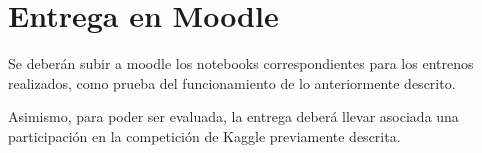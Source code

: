 \documentclass[a4paper]{article}
\begin{document}
\section{Entrega en Moodle}
Se deberán subir a moodle los notebooks correspondientes para los entrenos realizados, como prueba del funcionamiento de lo anteriormente descrito.

Asimismo, para poder ser evaluada, la entrega deberá llevar asociada una participación en la competición de Kaggle previamente descrita.

\doclicenseThis
\end{document}
